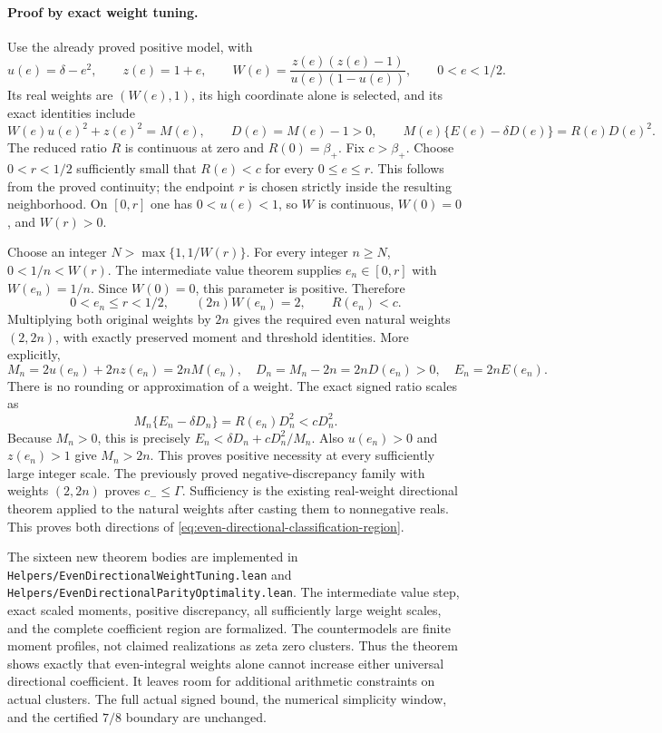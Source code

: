 \paragraph{Proof by exact weight tuning.}
Use the already proved positive model, with
\[
 u(e)=\delta-e^2,\qquad z(e)=1+e,\qquad
 W(e)=\frac{z(e)(z(e)-1)}{u(e)(1-u(e))},\qquad 0<e<1/2.
\]
Its real weights are \((W(e),1)\), its high coordinate alone is selected,
and its exact identities include
\[
 W(e)u(e)^2+z(e)^2=M(e),\qquad D(e)=M(e)-1>0,
 \qquad M(e)\{E(e)-\delta D(e)\}=R(e)D(e)^2.
\]
The reduced ratio \(R\) is continuous at zero and
\(R(0)=\beta_+\).  Fix \(c>\beta_+\).  Choose \(0<r<1/2\) sufficiently
small that \(R(e)<c\) for every \(0\le e\le r\).  This follows from the
proved continuity; the endpoint \(r\) is chosen strictly inside the resulting
neighborhood.  On \([0,r]\) one has \(0<u(e)<1\), so \(W\) is continuous,
\(W(0)=0\), and \(W(r)>0\).

Choose an integer \(N>\max\{1,1/W(r)\}\).  For every integer \(n\ge N\),
\(0<1/n<W(r)\).  The intermediate value theorem supplies
\(e_n\in[0,r]\) with \(W(e_n)=1/n\).  Since \(W(0)=0\), this parameter
is positive.  Therefore
\[
 0<e_n\le r<1/2,\qquad (2n)W(e_n)=2,\qquad R(e_n)<c.
\]
Multiplying both original weights by \(2n\) gives the required even
natural weights \((2,2n)\), with exactly preserved moment and threshold
identities.  More explicitly,
\[
 M_n=2u(e_n)+2nz(e_n)=2nM(e_n),\quad
 D_n=M_n-2n=2nD(e_n)>0,\quad E_n=2nE(e_n).
\]
There is no rounding or approximation of a weight.  The exact signed ratio
scales as
\[
 M_n\{E_n-\delta D_n\}=R(e_n)D_n^2<cD_n^2.
\]
Because \(M_n>0\), this is precisely
\(E_n<\delta D_n+cD_n^2/M_n\).  Also \(u(e_n)>0\) and \(z(e_n)>1\)
give \(M_n>2n\).  This proves positive necessity at every sufficiently large
integer scale.  The previously proved negative-discrepancy family with
weights \((2,2n)\) proves \(c_-\le\Gamma\).  Sufficiency is the existing
real-weight directional theorem applied to the natural weights after casting
them to nonnegative reals.  This proves both directions of
\eqref{eq:even-directional-classification-region}.

The sixteen new theorem bodies are implemented in
\texttt{Helpers/EvenDirectionalWeightTuning.lean} and
\texttt{Helpers/EvenDirectionalParityOptimality.lean}.  The intermediate
value step, exact scaled moments, positive discrepancy, all sufficiently
large weight scales, and the complete coefficient region are formalized.
The countermodels are finite moment profiles, not claimed realizations as
zeta zero clusters.  Thus the theorem shows exactly that even-integral
weights alone cannot increase either universal directional coefficient.
It leaves room for additional arithmetic constraints on actual clusters.
The full actual signed bound, the numerical simplicity window, and the
certified \(7/8\) boundary are unchanged.

